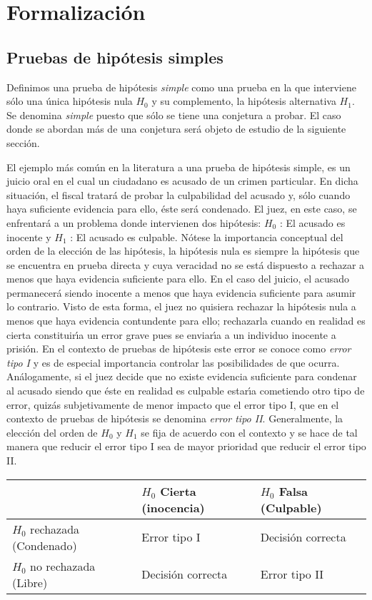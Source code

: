 \documentclass{article}
\theoremstyle{definition}
\begin{document}
 \section{Formalización}
 \subsection{Pruebas de hipótesis simples}
 Definimos una prueba de hipótesis \textit{simple} como una prueba en la que interviene sólo una única hipótesis nula $H_0$ y su complemento, la hipótesis alternativa $H_1$. Se denomina \textit{simple} puesto que sólo se tiene una conjetura a probar. El caso donde se abordan más de una conjetura será objeto de estudio de la siguiente sección. 
 
El ejemplo más común en la literatura a una prueba de hipótesis simple, es un juicio oral en el cual
un ciudadano es acusado de un crimen particular. En dicha situación, el fiscal tratará de probar la
culpabilidad del acusado y, sólo cuando haya suficiente evidencia para ello, éste será condenado. El
juez, en este caso, se enfrentará a un problema donde intervienen dos hipótesis: $H_0$ : El acusado es
inocente y $H_1$ : El acusado es culpable. Nótese la importancia conceptual del orden de la elección de las hipótesis, la hipótesis nula es siempre la hipótesis que se encuentra en prueba directa y cuya
veracidad no se está dispuesto a rechazar a menos que haya evidencia suficiente para ello. En el caso
del juicio, el acusado permanecerá siendo inocente a menos que haya evidencia suficiente para asumir lo
contrario. Visto de esta forma, el juez no quisiera rechazar la hipótesis nula a menos que haya evidencia
contundente para ello; rechazarla cuando en realidad es cierta constituirı́a un error grave pues se enviarı́a
a un individuo inocente a prisión. En el contexto de pruebas de hipótesis este error se conoce como \textit{error
	tipo I }y es de especial importancia controlar las posibilidades de que ocurra. Análogamente, si el juez
decide que no existe evidencia suficiente para condenar al acusado siendo que éste en realidad es culpable
estarı́a cometiendo otro tipo de error, quizás subjetivamente de menor impacto que el error tipo I, que
en el contexto de pruebas de hipótesis se denomina \textit{error tipo II}. Generalmente, la elección del orden de
$H_0$ y $H_1$ se fija de acuerdo con el contexto y se hace de tal manera que reducir el error tipo I sea de
mayor prioridad que reducir el error tipo II.
\begin{center}
	\begin{tabular}{ | m{4.3cm} | m{3.3cm}| m{3.3cm} | } 
		\hline
		& $H_0$ Cierta (inocencia) & $H_0$ Falsa (Culpable)\\ 
		\hline
		$H_0$ rechazada (Condenado) & Error tipo I & Decisión correcta\\ 
		\hline
		$H_0$ no rechazada (Libre)  & Decisión correcta& Error tipo II\\ 
		\hline
	\end{tabular}
\end{center}
\end{document}
